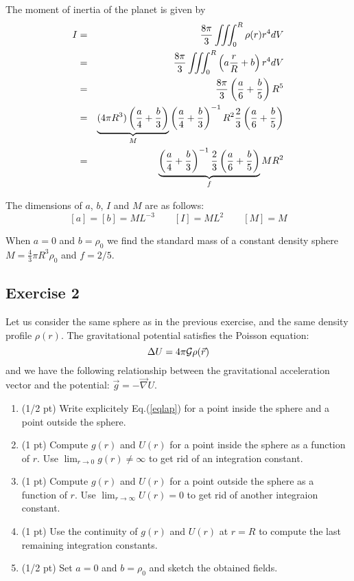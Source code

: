 The moment of inertia of the planet is given by
\begin{eqnarray}
I
&=& \frac{8\pi}{3} \iiint_0^R \rho(r) r^4 dV \nonumber\\
&=& \frac{8\pi}{3} \iiint_0^R \left(a\frac{r}{R}+b\right) r^4 dV \nonumber\\
&=& \frac{8\pi}{3} \left( \frac{a}{6} + \frac{b}{5} \right) R^5 \nonumber\\
&=& \underbrace{(4 \pi R^3 ) \left( \frac{a}{4} + \frac{b}{3} \right)}_{M}
\left( \frac{a}{4} + \frac{b}{3} \right)^{-1} 
R^2  \frac23\left( \frac{a}{6} + \frac{b}{5} \right) \nonumber\\
&=& \underbrace{\left( \frac{a}{4} + \frac{b}{3} \right)^{-1}
\frac23 \left( \frac{a}{6} + \frac{b}{5} \right)}_{f} M R^2
\end{eqnarray}

The dimensions of $a$, $b$, $I$ and $M$ are as follows:
\[
[a]=[b]=ML^{-3}
\qquad
[I]= ML^2
\qquad
[M]=M
\]

When $a=0$ and $b=\rho_0$ we find the standard mass of a constant density sphere 
$M=\frac43 \pi R^3 \rho_0$ and $f=2/5$.


\subsection*{Exercise 2}





Let us consider the same sphere as in the previous exercise, and the same density profile $\rho(r)$.
The gravitational potential satisfies the Poisson equation:
\begin{equation}
\Delta U = 4 \pi {\cal G} \rho({\vec r}) \label{eqlap}
\end{equation}
and we have the following relationship between the gravitational acceleration 
vector and the potential: ${\vec g}=-{\vec \nabla} U$.

\begin{enumerate}
\item (1/2 pt) Write explicitely Eq.(\ref{eqlap}) for a point inside the sphere and a point outside the sphere.
\item (1 pt) Compute $g(r)$ and $U(r)$ for a point inside the sphere as a function of $r$. Use
$\lim_{r\rightarrow 0} g(r) \neq \infty$
to get rid of an integration constant.
\item (1 pt) Compute $g(r)$ and $U(r)$ for a point outside the sphere as a function of $r$.
Use $\lim_{r\rightarrow\infty}U(r)=0$ to get rid of another integraion constant.
\item (1 pt) Use the continuity of $g(r)$ and $U(r)$ at $r=R$
to compute the last remaining integration constants.
\item (1/2 pt) Set $a=0$ and $b=\rho_0$ and sketch the obtained fields.
\end{enumerate}



